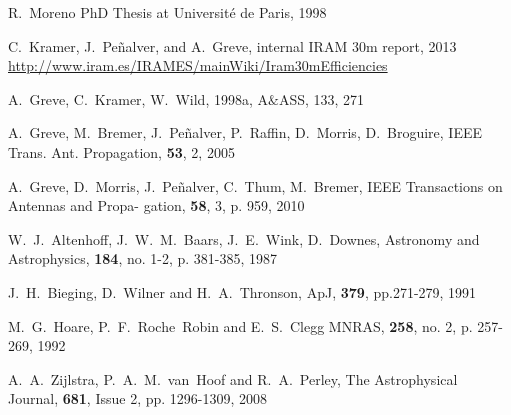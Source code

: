 \begin{thebibliography}{99}
R.~Moreno PhD Thesis at
Universit\'e de Paris, 1998
  
  C.~Kramer, J.~Pe\~nalver, and A.~Greve, internal IRAM 30m report,
  2013
  \url{http://www.iram.es/IRAMES/mainWiki/Iram30mEfficiencies}

A.~Greve, C.~Kramer, W.~Wild, 1998a, A$\&$ASS, 133, 271

A.~Greve, M.~Bremer, J.~Pe\~nalver, P.~Raffin, D.~Morris, D.~Broguire,
IEEE Trans. Ant. Propagation, {\bf 53}, 2, 2005
  
 A.~Greve, D.~Morris, J.~Pe\~nalver, C.~Thum, M.~Bremer, IEEE Transactions on Antennas and Propa-
 gation, {\bf 58}, 3, p. 959, 2010

  W.~J.~Altenhoff,  J.~W.~M.~Baars,  J.~E.~Wink, D.~Downes, 
  Astronomy and Astrophysics, {\bf 184}, no. 1-2, p. 381-385, 1987


  J.~H.~Bieging, D.~Wilner and  H.~A.~Thronson, ApJ, {\bf 379},
  pp.271-279, 1991

  M.~G.~Hoare, P.~F.~Roche~Robin and E.~S.~Clegg 
 MNRAS, {\bf 258}, no. 2, p. 257-269, 1992 

  A.~A.~Zijlstra,  P.~A.~M.~van~Hoof and R.~A.~Perley,
  The Astrophysical Journal, {\bf 681}, Issue 2, pp. 1296-1309, 2008
  

\end{thebibliography}
